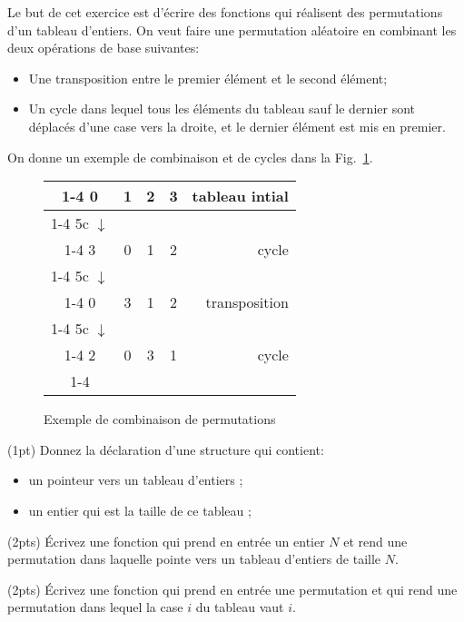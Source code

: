 
Le but de cet exercice est d'{\'e}crire des fonctions qui r{\'e}alisent des
permutations d'un tableau d'entiers. On veut faire une permutation
al{\'e}atoire en combinant les deux op{\'e}rations de base suivantes:
\begin{itemize}
\item Une transposition entre le premier {\'e}l{\'e}ment et le second {\'e}l{\'e}ment;
\item Un cycle dans lequel tous les {\'e}l{\'e}ments du tableau sauf le
  dernier sont d{\'e}plac{\'e}s d'une case vers la droite, et le dernier
  {\'e}l{\'e}ment est mis en premier.
\end{itemize}
On donne un exemple de combinaison et de cycles dans la Fig.~\ref{fig:permutation}.

\begin{figure}[hbp]
  \centering
  \begin{tabular}{|c|c|c|c|r}
    \cline{1-4}
    0&1&2&3& \hspace*{3em}tableau intial\\
    \cline{1-4}
    \multicolumn 5c {$\downarrow$}\\
    \cline{1-4}
    3&0&1&2& cycle\\
    \cline{1-4}
    \multicolumn 5c {$\downarrow$}\\
    \cline{1-4}
    0&3&1&2& transposition\\
    \cline{1-4}
    \multicolumn 5c {$\downarrow$}\\
    \cline{1-4}
    2&0&3&1& cycle\\
    \cline{1-4}
  \end{tabular}
  \caption{\label{fig:permutation}Exemple de combinaison de permutations}
\end{figure}

\question (1pt) Donnez la d{\'e}claration d'une structure  qui contient:
\begin{itemize}
\item un pointeur  vers un tableau d'entiers ;
\item un entier  qui est la taille de ce tableau ;
\end{itemize}

\question (2pts) {\'E}crivez une fonction  qui prend en
entr{\'e}e un entier $N$ et rend une permutation dans laquelle 
pointe vers un tableau d'entiers de taille $N$.

\question (2pts) {\'E}crivez une fonction  qui prend en
entr{\'e}e une permutation et qui rend une permutation dans lequel la case
$i$ du tableau vaut $i$.


